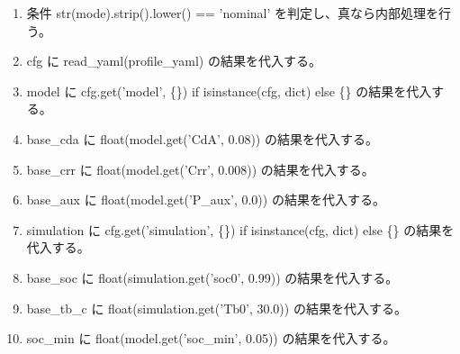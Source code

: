 \documentclass[a4paper,11pt]{article}
\begin{document}
            \begin{enumerate}[leftmargin=1.8em]
            \item 条件 str(mode).strip().lower() == 'nominal' を判定し、真なら内部処理を行う。
\item cfg に read\_yaml(profile\_yaml) の結果を代入する。
\item model に cfg.get('model', \{\}) if isinstance(cfg, dict) else \{\} の結果を代入する。
\item base\_cda に float(model.get('CdA', 0.08)) の結果を代入する。
\item base\_crr に float(model.get('Crr', 0.008)) の結果を代入する。
\item base\_aux に float(model.get('P\_aux', 0.0)) の結果を代入する。
\item simulation に cfg.get('simulation', \{\}) if isinstance(cfg, dict) else \{\} の結果を代入する。
\item base\_soc に float(simulation.get('soc0', 0.99)) の結果を代入する。
\item base\_tb\_c に float(simulation.get('Tb0', 30.0)) の結果を代入する。
\item soc\_min に float(model.get('soc\_min', 0.05)) の結果を代入する。
            \end{enumerate}
\end{document}
